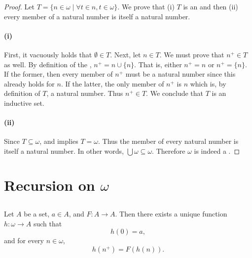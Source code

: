 \documentclass{report}
\begin{document}
  \begin{proof}

    Let $T = \{n \in \omega \mid \forall t \in n, t \in \omega\}$.
    We prove that (i) $T$ is an  and then (ii) every
      member of a natural number is itself a natural number.

    \paragraph{(i)}%

      First, it vacuously holds that $\emptyset \in T$.
      Next, let $n \in T$.
      We must prove that $n^+ \in T$ as well.
      By definition of the , $n^+ = n \cup \{n\}$.
      That is, either $n^+ = n$ or $n^+ = \{n\}$.
      If the former, then every member of $n^+$ must be a natural number since
        this already holds for $n$.
      If the latter, the only member of $n^+$ is $n$ which is, by definition of
        $T$, a natural number.
      Thus $n^+ \in T$.
      We conclude that $T$ is an inductive set.

    \paragraph{(ii)}%

      Since $T \subseteq \omega$,  and
         implies $T = \omega$.
      Thus the member of every natural number is itself a natural number.
      In other words, $\bigcup \omega \subseteq \omega$.
      Therefore $\omega$ is indeed a .

  \end{proof}

\section{Recursion on \texorpdfstring{$\omega$}{the Natural Numbers}}%

\subsection{}%

  \begin{theorem}
    Let $A$ be a set, $a \in A$, and $F \colon A \rightarrow A$.
    Then there exists a unique function $h \colon \omega \rightarrow A$ such
      that $$h(0) = a,$$ and for every $n \in \omega$, $$h(n^+) = F(h(n)).$$
  \end{theorem}
\end{document}
